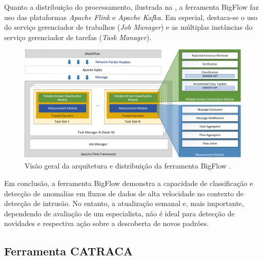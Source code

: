 \newcommand{\kafka}{\emph{Apache Kafka}\xspace}
\newcommand{\flink}{\emph{Apache Flink}\xspace}

Quanto a distribuição do processamento, ilustrada na ,
a ferramenta BigFlow faz uso das plataformas \flink e \kafka.
Em especial, destaca-se o uso do serviço gerenciador de trabalhos (\emph{Job
Manager}) e as múltiplas instâncias do serviço gerenciador de tarefas
(\emph{Task Manager}).

\begin{figure}[ht]
    \centering
    \includegraphics[width=\textwidth]{figuras/bigflow-fig5-bigflow_arch.png}
    \caption{Visão geral da arquitetura e distribuição da ferramenta BigFlow \cite{Viegas2019}.}
    \label{fig:bigflow-arch}
\end{figure}

Em conclusão, a ferramenta BigFlow demonstra a capacidade de classificação e
detecção de anomalias em fluxos de dados de alta velocidade no contexto de
detecção de intrusão.
No entanto, a atualização semanal e, mais importante, dependendo de avaliação de um
especialista, não é ideal para detecção de novidades e respectiva ação sobre a
descoberta de novos padrões.


\subsection{Ferramenta CATRACA}

